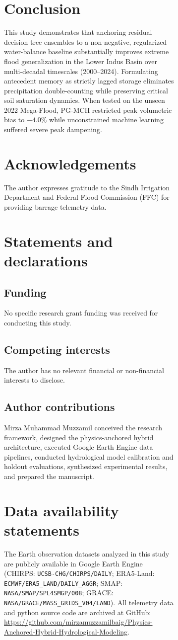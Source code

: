 \documentclass[11pt,a4paper,fleqn]{article}
\begin{document}
\begin{figure}[htbp]
\begin{figure}[htbp]
\section{Conclusion}
This study demonstrates that anchoring residual decision tree ensembles to a non-negative, regularized water-balance baseline substantially improves extreme flood generalization in the Lower Indus Basin over multi-decadal timescales (2000--2024). Formulating antecedent memory as strictly lagged storage eliminates precipitation double-counting while preserving critical soil saturation dynamics. When tested on the unseen 2022 Mega-Flood, PG-MCH restricted peak volumetric bias to $-4.0\%$ while unconstrained machine learning suffered severe peak dampening.

\section*{Acknowledgements}
The author expresses gratitude to the Sindh Irrigation Department and Federal Flood Commission (FFC) for providing barrage telemetry data.

\section*{Statements and declarations}

\subsection*{Funding}
No specific research grant funding was received for conducting this study.

\subsection*{Competing interests}
The author has no relevant financial or non-financial interests to disclose.

\subsection*{Author contributions}
Mirza Muhammad Muzzamil conceived the research framework, designed the physics-anchored hybrid architecture, executed Google Earth Engine data pipelines, conducted hydrological model calibration and holdout evaluations, synthesized experimental results, and prepared the manuscript.

\section*{Data availability statements}
The Earth observation datasets analyzed in this study are publicly available in Google Earth Engine (CHIRPS: \texttt{UCSB-CHG/CHIRPS/DAILY}; ERA5-Land: \texttt{ECMWF/ERA5\_LAND/DAILY\_AGGR}; SMAP: \texttt{NASA/SMAP/SPL4SMGP/008}; GRACE: \texttt{NASA/GRACE/MASS\_GRIDS\_V04/LAND}). All telemetry data and python source code are archived at GitHub: \url{https://github.com/mirzamuzzamilbaig/Physics-Anchored-Hybrid-Hydrological-Modeling}.


\end{figure}
\end{figure}
\end{document}
